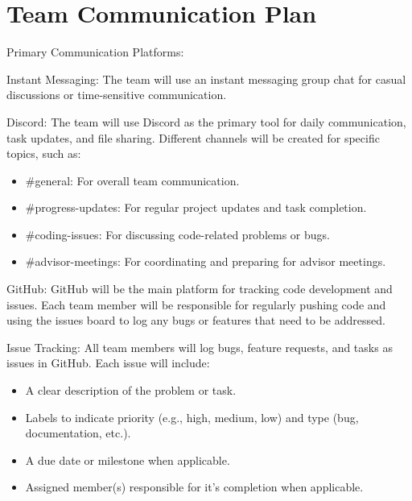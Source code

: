 \documentclass{article}
\begin{document}
\section{Team Communication Plan}

Primary Communication Platforms:\par

\begin{flushleft}
  Instant Messaging: The team will use an instant messaging group chat for casual discussions or time-sensitive communication.\par

  Discord: The team will use Discord as the primary tool for daily communication, task updates, and file sharing. Different channels will be created for specific topics, such as:
\end{flushleft}

\begin{itemize}
    \item \#general: For overall team communication.
    \item \#progress-updates: For regular project updates and task completion.
    \item \#coding-issues: For discussing code-related problems or bugs.
    \item \#advisor-meetings: For coordinating and preparing for advisor meetings.
\end{itemize}

\begin{flushleft}
  GitHub: GitHub will be the main platform for tracking code development and issues. Each team member will be responsible for regularly pushing code and using the issues board to log any bugs or features that need to be addressed.\par

  Issue Tracking: All team members will log bugs, feature requests, and tasks as issues in GitHub. Each issue will include:
\end{flushleft}

\begin{itemize}
    \item A clear description of the problem or task.
    \item Labels to indicate priority (e.g., high, medium, low) and type (bug, documentation, etc.).
    \item A due date or milestone when applicable.
    \item Assigned member(s) responsible for it's completion when applicable.
\end{itemize}
\end{document}

